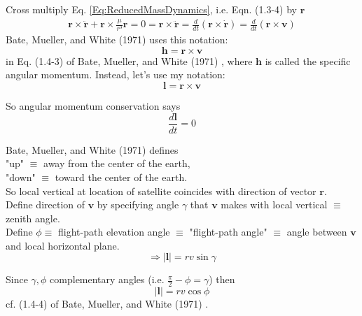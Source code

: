 \documentclass[10pt]{amsart}
\begin{document}
\begin{multicols*}{2}
Cross multiply Eq. \ref{Eq:ReducedMassDynamics}, i.e. Eqn. (1.3-4) by $\mathbf{r}$
\[
\begin{gathered}
	\mathbf{r} \times \ddot{\mathbf{r}} + \mathbf{r} \times \frac{\mu}{r^3} \mathbf{r} = 0 = \mathbf{r} \times \ddot{\mathbf{r}} = \frac{d}{dt} ( \mathbf{r} \times \dot{\mathbf{r}}) = \frac{d}{dt} (\mathbf{r} \times \mathbf{v})
\end{gathered}
\]
Bate, Mueller, and White (1971) \cite{BMW1971} uses this notation:
\begin{equation}
	\mathbf{h} = \mathbf{r} \times \mathbf{v} 
\end{equation}
in Eq. (1.4-3) of Bate, Mueller, and White (1971) \cite{BMW1971}, where $\mathbf{h}$ is called the specific angular momentum. Instead, let's use my notation:
\begin{equation}
	\mathbf{l} = \mathbf{r} \times \mathbf{v}
\end{equation}

So angular momentum conservation says
\begin{equation}\label{Eq:SpecificAngularMomentumConservation}
	\frac{d \mathbf{l} }{dt} = 0
\end{equation}

Bate, Mueller, and White (1971) \cite{BMW1971} defines \\
"up" $\equiv $ away from the center of the earth, \\
"down" $\equiv$ toward the center of the earth. \\

So local vertical at location of satellite coincides with direction of vector $\mathbf{r}$. \\

Define direction of $\mathbf{v}$ by specifying angle $\gamma$ that $\mathbf{v}$ makes with local vertical $\equiv $ zenith angle. \\
Define $\phi \equiv$ flight-path elevation angle $\equiv$ "flight-path angle" $\equiv$ angle between $\mathbf{v}$ and local horizontal plane. \\

\[
\Longrightarrow |\mathbf{l} | = rv \sin{\gamma}
\]

Since $\gamma, \phi$ complementary angles (i.e. $\frac{\pi}{2} - \phi = \gamma$) then
\begin{equation}
	\boxed{ | \mathbf{l} | = rv \cos{\phi} }
\end{equation}
cf. (1.4-4) of Bate, Mueller, and White (1971) \cite{BMW1971}.


\end{multicols*}
\end{document}
